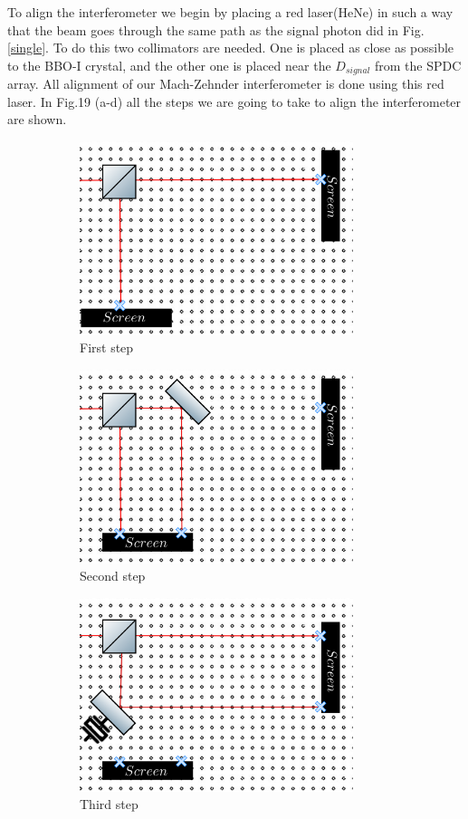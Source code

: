 \documentclass{book}
\begin{document}
To align the interferometer we begin by placing a red laser(HeNe) in such a way that the beam goes through the same path as the signal photon did in Fig. \ref{single}. To do this two collimators are needed. One is placed as close as possible to the BBO-I crystal, and the other one is placed near the $D_{signal}$ from the SPDC array. All alignment of our Mach-Zehnder interferometer is done using this red laser. In Fig.19 (a-d) all the steps we are going to take to align the interferometer are shown.

\begin{figure}[]
\centering
\begin{subfigure}[b]{0.55\linewidth}
\includegraphics[width=8cm,height=4 cm]{images/first_step.png}
\caption{First step}
\label{fig:BS1}
\end{subfigure}
\begin{subfigure}[b]{0.55\linewidth}
\includegraphics[width=8cm,height=4 cm]{images/second_step.png}
\caption{Second step}
\label{fig:BS1}
\end{subfigure}
\begin{subfigure}[b]{0.55\linewidth}
\includegraphics[width=8cm,height=4 cm]{images/third_step.png}
\caption{Third step}
\label{fig:BS1}
\end{subfigure}
\begin{subfigure}[b]{0.55\linewidth}

\end{subfigure}
\end{figure}
\end{document}
